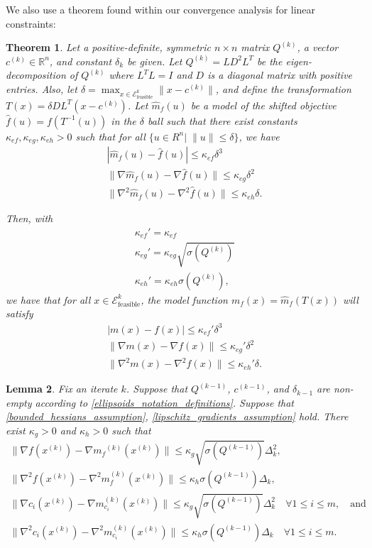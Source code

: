 \documentclass{article}
\newtheorem{theorem}{Theorem}[section]
\newtheorem{lemma}[theorem]{Lemma}
\theoremstyle{case}
\numberwithin{theorem}{subsection}
\newcommand{\ck}{{c^{(k)}}}
\newcommand{\dk}{\Delta_k}
\newcommand{\gmcik}{{\nabla m_{c_i}^{(k)}\left(\xk\right)}}
\newcommand{\gradf}{\nabla f}
\newcommand{\hk}{{\nabla^2m_f^{(k)}(x^{(k)})}}
\newcommand{\mfk}{{{m}_f}^{(k)}}
\newcommand{\qk}{{Q^{(k)}}}
\newcommand{\Rn}{\mathbb R^n}
\newcommand{\sdk}{{\delta_k}}
\newcommand{\unshiftedellipsoid}{{\mathcal E^k_{\textrm{feasible}}}}
\newcommand{\xk}{{x^{(k)}}}
\newcommand{\qkmo}{{Q^{(k-1)}}}
\newcommand{\ckmo}{{c^{(k-1)}}}
\newcommand{\sdkmo}{{\delta_{k-1}}}
\begin{document}
We also use a theorem found within our convergence analysis for linear constraints:
\begin{theorem}
\label{shifted_ellipsoid}
Let a positive-definite, symmetric $n\times n$ matrix $\qk$, a vector $\ck \in \Rn$, and constant $\sdk$ be given.
Let $\qk = L D^2 L^T$ be the eigen-decomposition of $\qk$ where $L^TL = I$ and $D$ is a diagonal matrix with positive entries.
Also, let $\delta = \max_{x\in \unshiftedellipsoid}\|x-\ck\|$, 
and define the transformation $T(x) = \delta DL^T(x - \ck)$.
Let $\hat m_f(u)$ be a model of the shifted objective $\hat f(u) = f(T^{-1}(u))$ in the $\delta$ ball such that
there exist constants $\kappa_{ef}, \kappa_{eg}, \kappa_{eh} > 0$ such that for all $\{u \in R^n | \;\|u\| \le \delta \}$, we have
\begin{align*}
|\hat m_f(u) - \hat f(u)| \le \kappa_{ef} \delta^3\\
\|\nabla \hat m_f(u) - \nabla \hat f(u)\| \le \kappa_{eg}\delta^2\\
\|\nabla^2 \hat m_f(u) - \nabla^2 \hat f(u)\| \le \kappa_{eh}\delta.
\end{align*}

Then, with
\begin{align*}
\kappa_{ef}' = \kappa_{ef} \\
\kappa_{eg}' = \kappa_{eg}\sqrt{\sigma(\qk)} \\
\kappa_{eh}' = \kappa_{eh}\sigma(\qk),
\end{align*}
we have that for all $x \in \unshiftedellipsoid$,
the model function $m_f(x) = \hat m_f(T(x))$ will satisfy
\begin{align*}
| m(x) - f(x)| \le \kappa_{ef}'\delta^3 \\
\|\nabla  m(x) - \nabla  f(x)\| \le \kappa_{eg}'\delta^2 \\
\|\nabla^2 m(x) - \nabla^2 f(x)\| \le \kappa_{eh}'\delta.
\end{align*}
\end{theorem}


\begin{lemma}
\label{accuracy_is_satisfied_lemma}
Fix an iterate $k$.
Suppose that $\qkmo$, $\ckmo$, and $\sdkmo$ are non-empty according to \cref{ellipsoids_notation_definitions}.
Suppose that \cref{bounded_hessians_assumption}, \cref{lipschitz_gradients_assumption} hold.
There exist $\kappa_g>0$ and $\kappa_h>0$ such that
\begin{align*}
\|\gradf(\xk) - \nabla \mfk(\xk) \| \le \kappa_g \sqrt{\sigma \left(\qkmo\right)} \dk^2, \\
\|\nabla^2 f(\xk) - \hk \| \le \kappa_h \sigma \left(\qkmo\right) \dk,  \\
\|\nabla c_i(\xk) - \gmcik \| \le \kappa_g \sqrt{\sigma \left(\qkmo\right)} \dk^2 \quad \forall 1 \le i \le m, \quad \textrm{and}\\
\|\nabla^2 c_i(\xk) - \nabla^2 m_{c_i}^{(k)}(\xk) \| \le \kappa_h \sigma \left(\qkmo\right) \dk \quad \forall 1 \le i \le m. \\
\end{align*}
\end{lemma}
\end{document}
